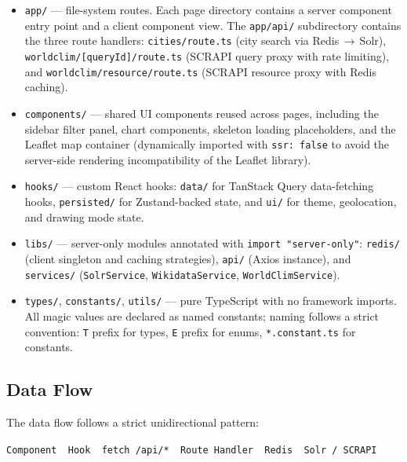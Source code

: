 \begin{itemize}
  \item \texttt{app/} --- file-system routes. Each page directory contains
    a server component entry point and a client component view. The
    \texttt{app/api/} subdirectory contains the three route handlers:
    \texttt{cities/route.ts} (city search via Redis\,$\to$\,Solr),
    \texttt{worldclim/[queryId]/route.ts} (SCRAPI query proxy with rate
    limiting), and \texttt{worldclim/resource/route.ts} (SCRAPI resource
    proxy with Redis caching).

  \item \texttt{components/} --- shared UI components reused across pages,
    including the sidebar filter panel, chart components, skeleton loading
    placeholders, and the Leaflet map container (dynamically imported with
    \texttt{ssr:~false} to avoid the server-side rendering incompatibility
    of the Leaflet library).

  \item \texttt{hooks/} --- custom React hooks: \texttt{data/} for TanStack
    Query data-fetching hooks, \texttt{persisted/} for Zustand-backed
    state, and \texttt{ui/} for theme, geolocation, and drawing mode state.

  \item \texttt{libs/} --- server-only modules annotated with
    \texttt{import "server-only"}: \texttt{redis/} (client singleton and
    caching strategies), \texttt{api/} (Axios instance), and
    \texttt{services/} (\texttt{SolrService}, \texttt{WikidataService},
    \texttt{WorldClimService}).

  \item \texttt{types/}, \texttt{constants/}, \texttt{utils/} --- pure
    TypeScript with no framework imports. All magic values are declared as
    named constants; naming follows a strict convention: \texttt{T} prefix
    for types, \texttt{E} prefix for enums, \texttt{*.constant.ts} for
    constants.
\end{itemize}

\subsection{Data Flow}\label{APP_ARCH_FLOW}

The data flow follows a strict unidirectional pattern:

\begin{center}
\texttt{Component \textrightarrow\ Hook \textrightarrow\ fetch /api/* \textrightarrow\
Route Handler \textrightarrow\ Redis \textrightarrow\ Solr / SCRAPI}
\end{center}

